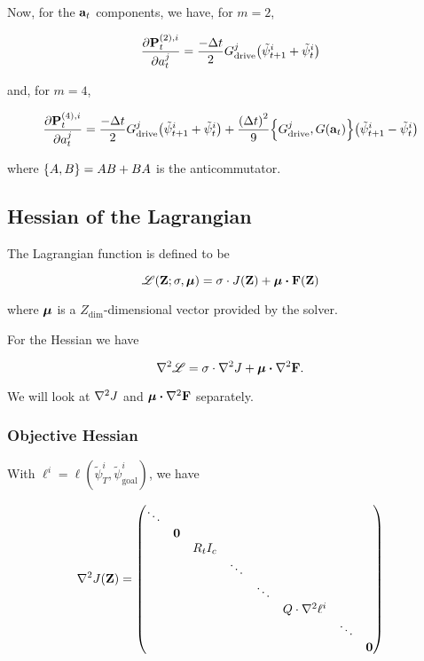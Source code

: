 \documentclass{article}
\newcommand{\isopsi}{\tilde \psi}
\begin{document}
Now, for the $\vb{a}_t$ components, we have, for $m = 2$,

\begin{equation}
  \pdv{\vb{P}_t^{(2),i}}{a^j_t} 
    = \frac{-\Delta t}{2} G^j_{\text{drive}} \qty(\isopsi^i_{t+1} + \isopsi^i_{t})
\end{equation}

and, for $m = 4$,

\begin{equation}
  \pdv{\vb{P}_t^{(4),i}}{a^j_t} 
    = \frac{-\Delta t}{2} G^j_{\text{drive}} \qty(\isopsi^i_{t+1} + \isopsi^i_{t}) + \frac{\qty(\Delta t)^2}{9} \qty{G^j_{\text{drive}}, G(\vb{a}_t)}\qty(\isopsi^i_{t+1} - \isopsi^i_{t})
\end{equation}

where $\qty{A, B} = AB + BA$ is the anticommutator. 


\newpage

\subsection{Hessian of the Lagrangian}

The Lagrangian function is defined to be

\begin{equation}
  \mathscr{L}(\vb{Z}; \sigma, \vb*{\mu}) = \sigma \cdot J(\vb{Z}) + \vb*{\mu} \vdot \vb{F}(\vb{Z})
\end{equation}

where $\vb*{\mu}$ is a $Z_{\dim}$-dimensional vector provided by the solver.

\hfill

For the Hessian we have 

\begin{equation}
  \laplacian \mathscr{L} = \sigma \cdot \laplacian J + \vb*{\mu} \vdot \laplacian \vb{F}.
\end{equation}

We will look at $\laplacian J$ and $\vb*{\mu} \vdot \laplacian \vb{F}$ separately.

\subsubsection*{Objective Hessian}

With $\ell^i = \ell(\isopsi^i_T, \isopsi^i_{\text{goal}})$, we have

\begin{equation}
  \laplacian J(\vb{Z}) = \mqty(
    \ddots \\
    & \vb{0} \\
    & & R_t I_c \\
    & & & \ddots \\
    & & & & \ddots \\
    & & & & & Q \cdot \laplacian \ell^i \\
    & & & & & & \ddots \\
    & & & & & & & \vb{0}
  ) 
\end{equation}
\end{document}
